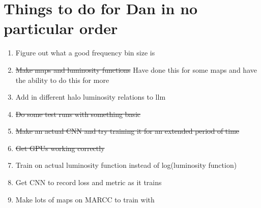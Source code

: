 \documentclass{article}
\begin{document}
	\section{Things to do for Dan in no particular order}
		\begin{enumerate}
			\item Figure out what a good frequency bin size is

			\item \sout{Make maps and luminosity functions} Have done this for some maps and have the ability to do this for more

			\item Add in different halo luminosity relations to llm

			\item \sout{Do some test runs with something basic}

			\item \sout{Make an actual CNN and try training it for an extended period of time}

			\item \sout{Get GPUs working correctly}

			\item Train on actual luminosity function instead of log(luminosity function)

			\item Get CNN to record loss and metric as it trains

			\item Make lots of maps on MARCC to train with
		\end{enumerate}


	
% 
\end{document}
